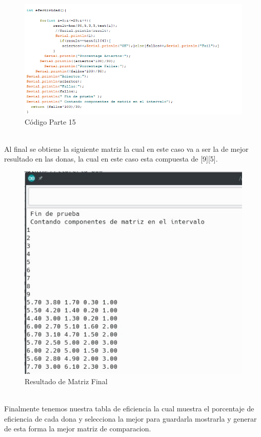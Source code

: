 \documentclass[10pt,a4paper]{article}
\begin{document}
\begin{figure}[H]
\caption{Código Parte 15}
\centering
\includegraphics[scale=0.9]{c15.png}
\end{figure}
\\
Al final se obtiene la siguiente matriz la cual en este caso va a ser la de mejor resultado en las donas, la cual en este caso esta compuesta de [9][5].
\begin{figure}[H]
\caption{Resultado de Matriz Final}
\centering
\includegraphics[scale=0.9]{matrizfinal.jpg}
\end{figure}
\\
Finalmente tenemos nuestra tabla de eficiencia la cual muestra el porcentaje de eficiencia de cada dona y selecciona la mejor para guardarla mostrarla y generar de esta forma la mejor matriz de comparacion.
\end{document}
